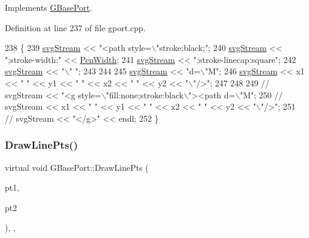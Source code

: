Implements \mbox{\hyperlink{class_g_base_port_a9e19a5d97e629c3d19be31e1938504c1}{G\+Base\+Port}}.



Definition at line 237 of file gport.\+cpp.


\begin{DoxyCode}
238 \{
239     \mbox{\hyperlink{class_s_v_g_port_ad3e240ca528cd784e138dce907d5d45a}{svgStream}} << \textcolor{stringliteral}{"<path style=\(\backslash\)"stroke:black;"};
240     \mbox{\hyperlink{class_s_v_g_port_ad3e240ca528cd784e138dce907d5d45a}{svgStream}} << \textcolor{stringliteral}{";stroke-width:"} << \mbox{\hyperlink{class_g_base_port_a9a76c3a8af8d0e9f29035d02d8f038c1}{PenWidth}};
241     \mbox{\hyperlink{class_s_v_g_port_ad3e240ca528cd784e138dce907d5d45a}{svgStream}} << \textcolor{stringliteral}{";stroke-linecap:square"};
242     \mbox{\hyperlink{class_s_v_g_port_ad3e240ca528cd784e138dce907d5d45a}{svgStream}} << \textcolor{stringliteral}{"\(\backslash\)" "}; 
243     
244     
245     \mbox{\hyperlink{class_s_v_g_port_ad3e240ca528cd784e138dce907d5d45a}{svgStream}} << \textcolor{stringliteral}{"d=\(\backslash\)"M"};
246     \mbox{\hyperlink{class_s_v_g_port_ad3e240ca528cd784e138dce907d5d45a}{svgStream}} << x1 << \textcolor{stringliteral}{" "} << y1 << \textcolor{stringliteral}{" "} << x2 << \textcolor{stringliteral}{" "} << y2 << \textcolor{stringliteral}{"\(\backslash\)"/>"};
247 
248 
249 \textcolor{comment}{//    svgStream << "<g style=\(\backslash\)"fill:none;stroke:black\(\backslash\)"><path d=\(\backslash\)"M";}
250 \textcolor{comment}{//    svgStream << x1 << " " << y1 << " " << x2 << " " << y2 << "\(\backslash\)"/>";}
251 \textcolor{comment}{//    svgStream << "</g>" << endl;}
252 \}
\end{DoxyCode}
\mbox{\label{class_g_base_port_ad176b1ff88c4c0a29d51869b13a288d2}} 
\subsubsection{\texorpdfstring{Draw\+Line\+Pts()}{DrawLinePts()}}
{\footnotesize\ttfamily virtual void G\+Base\+Port\+::\+Draw\+Line\+Pts (\begin{DoxyParamCaption}\item[{const \mbox{\hyperlink{class_g_point}{G\+Point}} \&}]{pt1,  }\item[{const \mbox{\hyperlink{class_g_point}{G\+Point}} \&}]{pt2 }\end{DoxyParamCaption})\hspace{0.3cm}{\ttfamily [inline]}, {\ttfamily [virtual]}, {\ttfamily [inherited]}}




